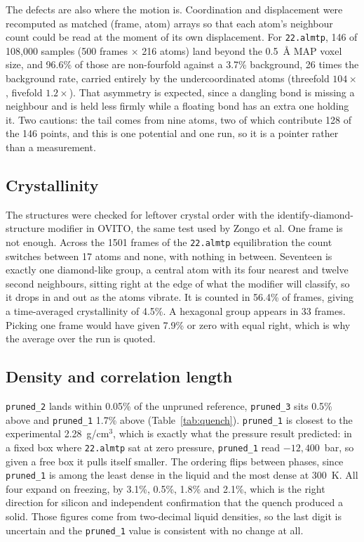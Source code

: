 \documentclass[11pt]{article}
\begin{document}
The defects are also where the motion is. Coordination and displacement were recomputed as matched (frame, atom) arrays so that each atom's neighbour count could be read at the moment of its own displacement. For \texttt{22.almtp}, 146 of 108{,}000 samples (500 frames $\times$ 216 atoms) land beyond the 0.5~\AA{} MAP voxel size, and 96.6\% of those are non-fourfold against a 3.7\% background, 26 times the background rate, carried entirely by the undercoordinated atoms (threefold $104\times$, fivefold $1.2\times$). That asymmetry is expected, since a dangling bond is missing a neighbour and is held less firmly while a floating bond has an extra one holding it. Two cautions: the tail comes from nine atoms, two of which contribute 128 of the 146 points, and this is one potential and one run, so it is a pointer rather than a measurement.

\subsection{Crystallinity}
\label{sec:crystal}
The structures were checked for leftover crystal order with the identify-diamond-structure modifier in OVITO, the same test used by Zongo et al. One frame is not enough. Across the 1501 frames of the \texttt{22.almtp} equilibration the count switches between 17 atoms and none, with nothing in between. Seventeen is exactly one diamond-like group, a central atom with its four nearest and twelve second neighbours, sitting right at the edge of what the modifier will classify, so it drops in and out as the atoms vibrate. It is counted in 56.4\% of frames, giving a time-averaged crystallinity of 4.5\%. A hexagonal group appears in 33 frames. Picking one frame would have given 7.9\% or zero with equal right, which is why the average over the run is quoted.

\subsection{Density and correlation length}
\label{sec:density}
\texttt{pruned\_2} lands within 0.05\% of the unpruned reference, \texttt{pruned\_3} sits 0.5\% above and \texttt{pruned\_1} 1.7\% above (Table~\ref{tab:quench}). \texttt{pruned\_1} is closest to the experimental 2.28~g/cm$^3$, which is exactly what the pressure result predicted: in a fixed box where \texttt{22.almtp} sat at zero pressure, \texttt{pruned\_1} read $-12{,}400$~bar, so given a free box it pulls itself smaller. The ordering flips between phases, since \texttt{pruned\_1} is among the least dense in the liquid and the most dense at 300~K. All four expand on freezing, by 3.1\%, 0.5\%, 1.8\% and 2.1\%, which is the right direction for silicon and independent confirmation that the quench produced a solid. Those figures come from two-decimal liquid densities, so the last digit is uncertain and the \texttt{pruned\_1} value is consistent with no change at all.
\end{document}
